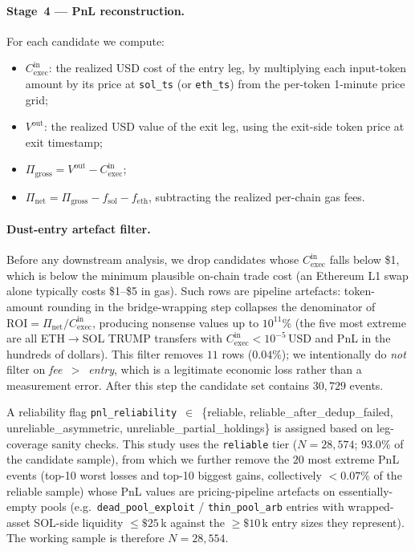 \documentclass[11pt,a4paper]{article}
\newcommand{\EthSol}{ETH$\to$SOL}
\newcommand{\Cexec}{C_{\text{exec}}}
\begin{document}
\paragraph{Stage~4 --- PnL reconstruction.} For each candidate we compute:
\begin{itemize}
    \item $\Cexec^{\text{in}}$: the realized USD cost of the entry leg, by
        multiplying each input-token amount by its price at
        \texttt{sol\_ts} (or \texttt{eth\_ts}) from the per-token 1-minute
        price grid;
    \item $V^{\text{out}}$: the realized USD value of the exit leg, using
        the exit-side token price at exit timestamp;
    \item $\Pi_{\text{gross}} = V^{\text{out}} - \Cexec^{\text{in}}$;
    \item $\Pi_{\text{net}} = \Pi_{\text{gross}} - f_{\text{sol}} - f_{\text{eth}}$,
        subtracting the realized per-chain gas fees.
\end{itemize}
\paragraph{Dust-entry artefact filter.} Before any downstream analysis,
we drop candidates whose $\Cexec^{\text{in}}$ falls below \$1, which is
below the minimum plausible on-chain trade cost (an Ethereum L1 swap
alone typically costs \$1--\$5 in gas). Such rows are pipeline artefacts:
token-amount rounding in the bridge-wrapping step collapses the
denominator of $\mathrm{ROI}=\Pi_{\text{net}}/\Cexec^{\text{in}}$,
producing nonsense values up to $10^{11}\%$ (the five most extreme are
all \EthSol{} TRUMP transfers with $\Cexec^{\text{in}}<\!10^{-5}$\,USD
and PnL in the hundreds of dollars). This filter removes $11$ rows
($0.04\%$); we intentionally do \emph{not} filter on \emph{fee~$>$~entry},
which is a legitimate economic loss rather than a measurement error.
After this step the candidate set contains $30{,}729$ events.

A reliability flag \texttt{pnl\_reliability}~$\in$~\{reliable,
reliable\_after\_dedup\_failed, unreliable\_asymmetric,
unreliable\_partial\_holdings\} is assigned based on leg-coverage sanity
checks. This study uses the \texttt{reliable} tier ($N=28{,}574$; $93.0\%$
of the candidate sample), from which we further remove the
$20$ most extreme PnL events (top-10 worst losses and top-10 biggest
gains, collectively $<\!0.07\%$ of the reliable sample) whose PnL
values are pricing-pipeline artefacts on essentially-empty pools
(e.g.\ \texttt{dead\_pool\_exploit} / \texttt{thin\_pool\_arb} entries
with wrapped-asset SOL-side liquidity $\leq\!\$25$\,k against the
$\geq\!\$10$\,k entry sizes they represent). The working sample is
therefore $N = 28{,}554$.
\end{document}

